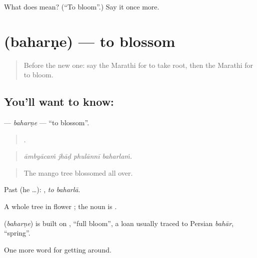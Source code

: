 \begin{tcolorbox}[breakable,colback=teal!4,colframe=teal!35!black,title={Before you move on}]
What does  mean? (\textquotedblleft{}To bloom\textquotedblright{}.) Say it once more.
\end{tcolorbox}
\section[\texorpdfstring{\mr{बहरणे} (baharṇe)}{बहरणे (baharṇe)}]{ (baharṇe) — to blossom}

\label{lesson:MR-C445-baharne}



\begin{quote}
Before the new one: say the Marathi for to take root, then the Marathi for to bloom.
\end{quote}

\subsection*{You'll want to know: }
\textbf{} — \emph{baharṇe} — \textquotedblleft{}to blossom\textquotedblright{}.

\begin{quote}
   .
\end{quote}

\begin{quote}
\emph{āmbyācaṁ jhāḍ phulānnī baharlaṁ.}
\end{quote}

\begin{quote}
The mango tree blossomed all over.
\end{quote}

Past (he …):  , \emph{to baharlā}.

A whole tree in flower ; the noun is .

\begin{cousinweb}
\textbf{} (\emph{baharṇe}) is built on \textbf{}, \textquotedblleft{}full bloom\textquotedblright{}, a loan usually traced to Persian \emph{bahār}, \textquotedblleft{}spring\textquotedblright{}.
\end{cousinweb}

\begin{grammarlens}[title={What you've built}]
One more word for getting around.
\end{grammarlens}

